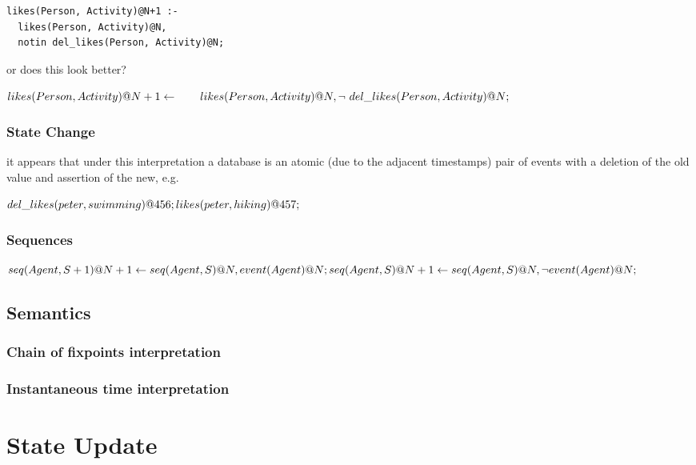 \documentclass{acm_proc_article-sp-sigmod09}
\begin{document}
\begin{verbatim}
likes(Person, Activity)@N+1 :-
  likes(Person, Activity)@N,
  notin del_likes(Person, Activity)@N;
\end{verbatim}

or does this look better?

$
likes(Person, Activity)@N+1 \leftarrow \\
  \quad \quad likes(Person, Activity)@N, \\
  \lnot~del\_likes(Person, Activity)@N;
$

\subsubsection{State Change}

it appears that under this interpretation a database is an atomic (due to the adjacent timestamps)
pair of events with a deletion of the old value and assertion of the new, e.g.

$
del\_likes(peter, swimming)@456; \\
likes(peter, hiking)@457;
$

\subsubsection{Sequences}

$
seq(Agent, S + 1)@N+1 \leftarrow \\
  seq(Agent, S)@N, \\
  event(Agent)@N; \\
  \\
seq(Agent, S)@N+1 \leftarrow \\
seq(Agent, S)@N, \\
\lnot event(Agent)@N;
$

\subsection{Semantics}
\subsubsection{Chain of fixpoints interpretation}
\subsubsection{Instantaneous time interpretation}


\section{State Update}
\end{document}
